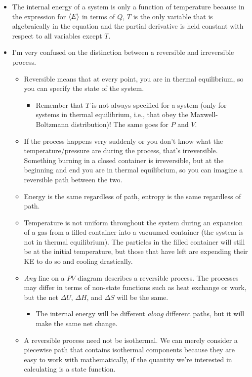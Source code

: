 \documentclass[../notes.tex]{subfiles}
\begin{document}
\begin{itemize}
    \item The internal energy of a system is only a function of temperature because in the expression for $\left\langle{E}\right\rangle$ in terms of $Q$, $T$ is the only variable that is algebraically in the equation and the partial derivative is held constant with respect to all variables except $T$.
    \item I'm very confused on the distinction between a reversible and irreversible process.
    \begin{itemize}
        \item Reversible means that at every point, you are in thermal equilibrium, so you can specify the state of the system.
        \begin{itemize}
            \item Remember that $T$ is not always specified for a system (only for systems in thermal equilibrium, i.e., that obey the Maxwell-Boltzmann distribution)! The same goes for $P$ and $V$.
        \end{itemize}
        \item If the process happens very suddenly or you don't know what the temperature/pressure are during the process, that's irreversible. Something burning in a closed container is irreversible, but at the beginning and end you are in thermal equilibrium, so you can imagine a reversible path between the two.
        \item Energy is the same regardless of path, entropy is the same regardless of path.
        \item Temperature is not uniform throughout the system during an expansion of a gas from a filled container into a vacuumed container (the system is not in thermal equilibrium). The particles in the filled container will still be at the initial temperature, but those that have left are expending their KE to do so and cooling drastically.
        \item \emph{Any} line on a $PV$ diagram describes a reversible process. The processes may differ in terms of non-state functions such as heat exchange or work, but the net $\Delta U$, $\Delta H$, and $\Delta S$ will be the same.
        \begin{itemize}
            \item The internal energy will be different \emph{along} different paths, but it will make the same net change.
        \end{itemize}
        \item A reversible process need not be isothermal. We can merely consider a piecewise path that contains isothermal components because they are easy to work with mathematically, if the quantity we're interested in calculating is a state function.

\end{itemize}
\end{itemize}
\end{document}
